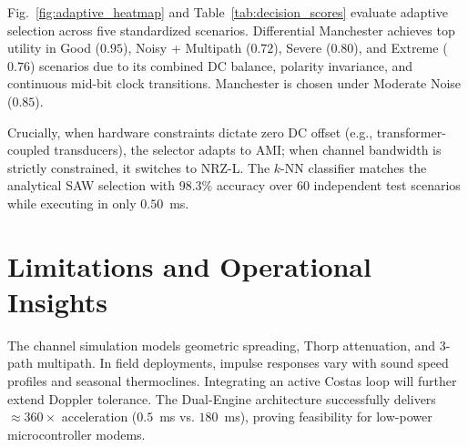 \documentclass[conference]{IEEEtran}
\begin{document}
\begin{table}[H]
\centering
\caption{Decision Scores by Scenario Across Candidate Line Codes}
\label{tab:decision_scores}
\end{table}

Fig.~\ref{fig:adaptive_heatmap} and Table~\ref{tab:decision_scores} evaluate adaptive selection across five standardized scenarios. Differential Manchester achieves top utility in Good ($0.95$), Noisy + Multipath ($0.72$), Severe ($0.80$), and Extreme ($0.76$) scenarios due to its combined DC balance, polarity invariance, and continuous mid-bit clock transitions. Manchester is chosen under Moderate Noise ($0.85$). 

Crucially, when hardware constraints dictate zero DC offset (e.g., transformer-coupled transducers), the selector adapts to AMI; when channel bandwidth is strictly constrained, it switches to NRZ-L. The $k$-NN classifier matches the analytical SAW selection with $98.3\%$ accuracy over $60$ independent test scenarios while executing in only $0.50$~ms.

\section{Limitations and Operational Insights}
The channel simulation models geometric spreading, Thorp attenuation, and 3-path multipath. In field deployments, impulse responses vary with sound speed profiles and seasonal thermoclines. Integrating an active Costas loop will further extend Doppler tolerance. The Dual-Engine architecture successfully delivers $\approx 360\times$ acceleration ($0.5$~ms vs. $180$~ms), proving feasibility for low-power microcontroller modems.
\end{document}
